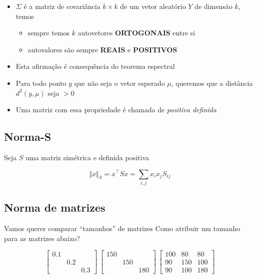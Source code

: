 \documentclass[
  letterpaper,
  DIV=11,
  numbers=noendperiod]{scrartcl}
\providecommand{\tightlist}{%
  \setlength{\itemsep}{0pt}\setlength{\parskip}{0pt}}\usepackage{longtable,booktabs,array}
\begin{document}
\begin{itemize}
\tightlist
\item
  \(\Sigma\) é a matriz de covariância \(k \times k\) de um vetor
  aleatório \(Y\) de dimensão \(k\), temos

  \begin{itemize}
  \tightlist
  \item
    sempre temos \(k\) autovetores \textbf{ORTOGONAIS} entre si
  \item
    autovalores são sempre \textbf{REAIS} e \textbf{POSITIVOS}
  \end{itemize}
\item
  Esta afirmação é consequência do teorema espectral
\item
  Para todo ponto \(y\) que não seja o vetor esperado \(\mu\), queremos
  que a distância \(d^2(y,\mu)\) seja \(>0\)
\item
  Uma matriz com essa propriedade é chamada de \emph{positiva definida}
\end{itemize}

\hypertarget{norma-s}{%
\subsection{Norma-S}\label{norma-s}}

Seja \(S\) uma matriz simétrica e definida positiva

\begin{tcolorbox}[enhanced jigsaw, title=\textcolor{quarto-callout-note-color}{\faInfo}\hspace{0.5em}{Definição Norma-S}, arc=.35mm, left=2mm, leftrule=.75mm, toprule=.15mm, colbacktitle=quarto-callout-note-color!10!white, bottomrule=.15mm, rightrule=.15mm, titlerule=0mm, breakable, colframe=quarto-callout-note-color-frame, opacitybacktitle=0.6, toptitle=1mm, opacityback=0, colback=white, bottomtitle=1mm, coltitle=black]
\[\Vert x\Vert_S = x^\top S x = \sum_{i,j}x_ix_jS_{ij}\]
\end{tcolorbox}

\hypertarget{norma-de-matrizes}{%
\subsection{Norma de matrizes}\label{norma-de-matrizes}}

Vamos querer comparar ``tamanhos'' de matrizes Como atribuir um tamanho
para as matrizes abaixo?

\[\begin{bmatrix}0.1 &&\\ &0.2&\\&&0.3\end{bmatrix}\,  \begin{bmatrix}150 &&\\ &150&\\&&180\end{bmatrix}\, \begin{bmatrix}100 &80&80\\ 90&150&100\\90&100&180\end{bmatrix}\]
\end{document}
